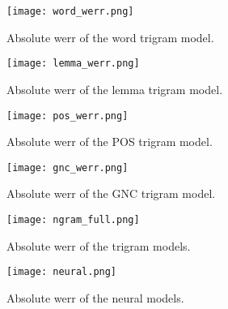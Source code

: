 \begin{figure}[!htbp]
	  \centering
	  \texttt{[image: word\_werr.png]}
	  \caption[Absolute WERR of the word trigram model]{Absolute \gls{werr} of the word trigram model.}
	      \label{figure:word}
\end{figure}

\begin{figure}[!htbp]
	  \centering
	  \texttt{[image: lemma\_werr.png]}
	  \caption[Absolute WERR of the lemma trigram model]{Absolute \gls{werr} of the lemma trigram model.}
	      \label{figure:lemma}
\end{figure}

\begin{figure}[!htbp]
	  \centering
	  \texttt{[image: pos\_werr.png]}
	  \caption[Absolute WERR of the POS trigram model]{Absolute \gls{werr} of the POS trigram model.}
	      \label{figure:pos}
\end{figure}

\begin{figure}[!htbp]
	  \centering
	  \texttt{[image: gnc\_werr.png]}
	  \caption[Absolute WERR of the GNC trigram model]{Absolute \gls{werr} of the GNC trigram model.}
	      \label{figure:gnc}
\end{figure}

\begin{figure}[!htbp]
	  \centering
	  \texttt{[image: ngram\_full.png]}
	  \caption[Absolute WERR of the trigram models]{Absolute \gls{werr} of the trigram models.}
	      \label{figure:neural}
\end{figure}

\begin{figure}[!htbp]
	  \centering
	  \texttt{[image: neural.png]}
	  \caption[Absolute WERR of the neural models]{Absolute \gls{werr} of the neural models.}
	      \label{figure:neural}
\end{figure}

\FloatBarrier
